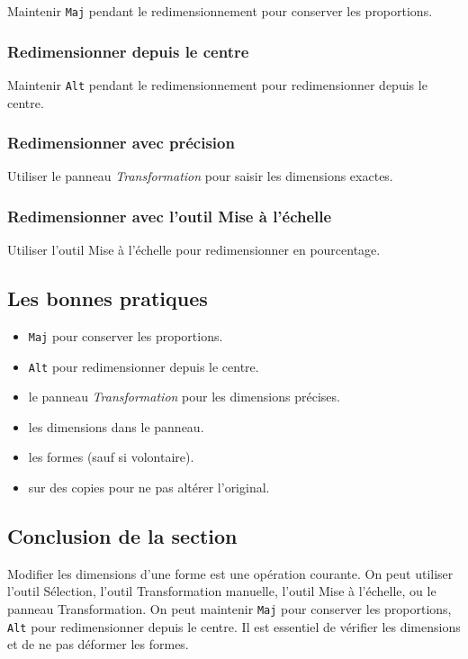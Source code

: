 Maintenir \texttt{Maj} pendant le redimensionnement pour conserver les proportions.

\subsubsection{Redimensionner depuis le centre}

Maintenir \texttt{Alt} pendant le redimensionnement pour redimensionner depuis le centre.

\subsubsection{Redimensionner avec précision}

Utiliser le panneau \emph{Transformation} pour saisir les dimensions exactes.

\subsubsection{Redimensionner avec l'outil Mise à l'échelle}

Utiliser l'outil Mise à l'échelle pour redimensionner en pourcentage.

\subsection{Les bonnes pratiques}

\begin{itemize}
    \item {} \texttt{Maj} pour conserver les proportions.
    \item {} \texttt{Alt} pour redimensionner depuis le centre.
    \item {} le panneau \emph{Transformation} pour les dimensions précises.
    \item {} les dimensions dans le panneau.
    \item {} les formes (sauf si volontaire).
    \item {} sur des copies pour ne pas altérer l'original.
\end{itemize}

\subsection*{Conclusion de la section}

Modifier les dimensions d'une forme est une opération courante. On peut utiliser l'outil Sélection, l'outil Transformation manuelle, l'outil Mise à l'échelle, ou le panneau Transformation. On peut maintenir \texttt{Maj} pour conserver les proportions, \texttt{Alt} pour redimensionner depuis le centre. Il est essentiel de vérifier les dimensions et de ne pas déformer les formes.

